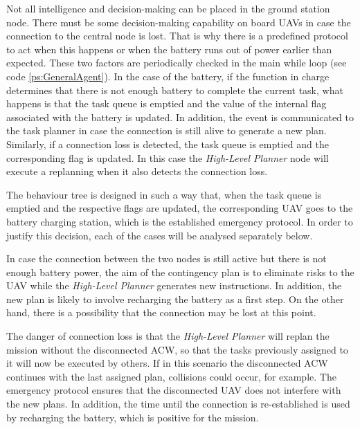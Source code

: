 Not all intelligence and decision-making can be placed in the ground station node. There must be some decision-making capability on board \glspl{UAV} in case the connection to the central node is lost. That is why there is a predefined protocol to act when this happens or when the battery runs out of power earlier than expected. These two factors are periodically checked in the main while loop (see code \ref{ps:GeneralAgent}). In the case of the battery, if the function in charge determines that there is not enough battery to complete the current task, what happens is that the task queue is emptied and the value of the internal flag associated with the battery is updated. In addition, the event is communicated to the task planner in case the connection is still alive to generate a new plan. Similarly, if a connection loss is detected, the task queue is emptied and the corresponding flag is updated. In this case the \emph{High-Level Planner} node will execute a replanning when it also detects the connection loss.

The behaviour tree is designed in such a way that, when the task queue is emptied and the respective flags are updated, the corresponding \gls{UAV} goes to the battery charging station, which is the established emergency protocol. In order to justify this decision, each of the cases will be analysed separately below.

In case the connection between the two nodes is still active but there is not enough battery power, the aim of the contingency plan is to eliminate risks to the \gls{UAV} while the \emph{High-Level Planner} generates new instructions. In addition, the new plan is likely to involve recharging the battery as a first step. On the other hand, there is a possibility that the connection may be lost at this point.

The danger of connection loss is that the \emph{High-Level Planner} will replan the mission without the disconnected \gls{ACW}, so that the tasks previously assigned to it will now be executed by others. If in this scenario the disconnected \gls{ACW} continues with the last assigned plan, collisions could occur, for example. The emergency protocol ensures that the disconnected \gls{UAV} does not interfere with the new plans. In addition, the time until the connection is re-established is used by recharging the battery, which is positive for the mission.


